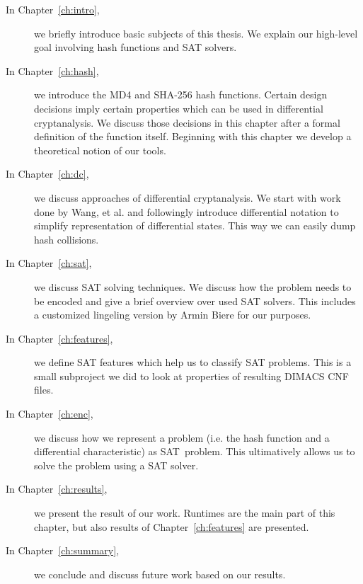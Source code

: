 \begin{description}
\item[In Chapter~\ref{ch:intro},] we briefly introduce basic subjects of this
  thesis. We explain our high-level goal involving hash functions and SAT solvers.

\item[In Chapter~\ref{ch:hash},] we introduce the MD4 and SHA-256 hash functions.
  Certain design decisions imply certain properties which can be used in differential
  cryptanalysis. We discuss those decisions in this chapter after a formal definition
  of the function itself. Beginning with this chapter we develop a theoretical notion
  of our tools.

\item[In Chapter~\ref{ch:dc},] we discuss approaches of differential cryptanalysis.
  We start with work done by Wang, et al. and followingly introduce differential
  notation to simplify representation of differential states. This way we can easily dump
  hash collisions.

\item[In Chapter~\ref{ch:sat},] we discuss SAT solving techniques. We discuss how
  the problem needs to be encoded and give a brief overview over used SAT solvers.
  This includes a customized lingeling version by Armin Biere for our purposes.

\item[In Chapter~\ref{ch:features},] we define SAT features which help us to
  classify SAT problems. This is a small subproject we did to look at properties
  of resulting DIMACS CNF files.

\item[In Chapter~\ref{ch:enc},] we discuss how we represent a problem (i.e. the hash
  function and a differential characteristic) as SAT~problem. This ultimatively
  allows us to solve the problem using a SAT solver.

\item[In Chapter~\ref{ch:results},] we present the result of our work.
  Runtimes are the main part of this chapter, but also results of Chapter~\ref{ch:features}
  are presented.

\item[In Chapter~\ref{ch:summary},] we conclude and discuss future work based on our results.
\end{description}
